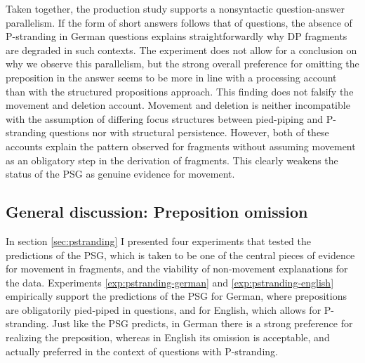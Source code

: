 Taken together, the production study supports a nonsyntactic question-answer parallelism. If the form of short answers follows that of questions, the absence of P-stranding in German questions explains straightforwardly why DP fragments are degraded in such contexts. The experiment does not allow for a conclusion on why we observe this parallelism, but the strong overall preference for omitting the preposition in the answer seems to be more in line with a processing account than with the structured propositions approach. This finding does not falsify the movement and deletion account. Movement and deletion is neither incompatible with the assumption of differing focus structures between pied-piping and P-stranding questions nor with structural persistence. However, both of these accounts explain the pattern observed for fragments without assuming movement as an obligatory step in the derivation of fragments. This clearly weakens the status of the PSG as genuine evidence for movement.

\subsection{General discussion: Preposition omission} \label{sec:pstranding-discussion}
In section \ref{sec:pstranding} I presented four experiments that tested the predictions of the PSG, which is taken to be one of the central pieces of evidence for movement in fragments, and the viability of non-movement explanations for the data. Experiments \ref{exp:pstranding-german} and \ref{exp:pstranding-english} empirically support the predictions of the PSG for German, where prepositions are obligatorily pied-piped in questions, and for English, which allows for P-stranding. Just like the PSG predicts, in German there is a strong preference for realizing the preposition, whereas in English its omission is acceptable, and actually preferred in the context of questions with P-stranding.

